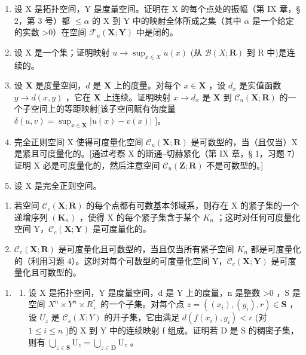 \ExerciseSection

\begin{enumerate}
\def\labelenumi{\arabic{enumi})}
\item
  设 X 是拓扑空间，Y 是度量空间。证明在 X 的每个点处的振幅（第 IX 章，§ 2，第 3 号）都 \(\leqslant\alpha\) 的 X 到 Y 中的映射全体所成之集（其中 \(\alpha\) 是一个给定的实数 \textgreater0）在空间 \(\mathcal{F}_{u}(\mathbf{X};\mathbf{Y})\) 中是闭的。
\item
  设 X 是一个集；证明映射 \(u \to \sup_{x \in X} u(x)\) (从 \(\mathcal{B}(X; \mathbf{R})\) 到 R 中)是连续的。
\item
  设 \(\mathbf{X}\) 是度量空间，\(d\) 是 \(\mathbf{X}\) 上的度量。对每个 \(x \in \mathbf{X}\) ，设 \(d_x\) 是实值函数 \(y \to d(x, y)\) ，它在 \(\mathbf{X}\) 上连续。证明映射 \(x \to d_x\) 是 \(\mathbf{X}\) 到 \(\mathcal{C}_u(\mathbf{X}; \mathbf{R})\) 的一个子空间上的等距映射{[}该子空间赋有伪度量 \(\delta(u, v) = \sup_{x \in \mathbf{X}} |u(x) - v(x)|\) {]}。
\item
  完全正则空间 X 使得可度量化空间 \(\mathcal{C}_{u}(\mathbf{X};\mathbf{R})\) 是可数型的，当（且仅当）X 是紧且可度量化的。{[}通过考察 X 的斯通–切赫紧化（第 IX 章，§ 1，习题 7）证明 X 必是可度量化的，然后注意空间 \(\mathcal{C}_{u}(\mathbf{Z};\mathbf{R})\) 不是可数型的。{]}
\item
  设 X 是完全正则空间。
\end{enumerate}

\begin{enumerate}
\def\labelenumi{\alph{enumi})}
\tightlist
\item
  若空间 \(\mathcal{C}_{c}(\mathbf{X};\mathbf{R})\) 的每个点都有可数基本邻域系，则存在 X 的紧子集的一个递增序列 \((\mathbf{K}_{n})\) ，使得 X 的每个紧子集含于某个 \(K_{n}\) ；这时对任何可度量化空间 Y，\(\mathcal{C}_{c}(\mathbf{X};\mathbf{Y})\) 是可度量化的。
\item
  \(\mathcal{C}_{c}(\mathbf{X};\mathbf{R})\) 是可度量化且可数型的，当且仅当所有紧子空间 \(K_{n}\) 都是可度量化的（利用习题 4）。这时对每个可数型的可度量化空间 Y，\(\mathcal{C}_{c}(\mathbf{X};\mathbf{Y})\) 是可度量化且可数型的。
\end{enumerate}

\begin{enumerate}
\def\labelenumi{\arabic{enumi})}
\setcounter{enumi}{5}
\tightlist
\item
  \begin{enumerate}
  \def\labelenumii{\alph{enumii})}
  \tightlist
  \item
    设 X 是拓扑空间，Y 是度量空间，d 是 Y 上的度量，n 是整数 \textgreater0 ，S 是空间 \(X^{n} \times Y^{n} \times R_{+}^{*}\) 的一个子集。对每个点 \(z = ((x_{i}), (y_{i}), r) \in \mathbf{S}\) ，设 \(U_{z}\) 是 \(\mathcal{C}_{s}(X; Y)\) 的开子集，它由满足 \(d(f(x_i), y_i) < r\) (对 \(1 \leqslant i \leqslant n\) )的 X 到 Y 中的连续映射 f 组成。证明若 D 是 S 的稠密子集，则有 \(\bigcup_{z \in \mathbf{S}} \mathrm{U}_z = \bigcup_{z \in \mathbf{D}} \mathrm{U}_z\) 。
  \end{enumerate}
\end{enumerate}

